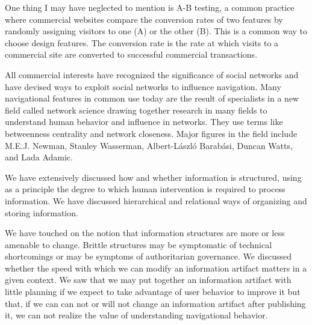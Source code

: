 One thing I may have neglected to mention is A-B testing, a common
practice where commercial websites compare the conversion rates of two
features by randomly assigning visitors to one (A) or the other (B).
This is a common way to choose design features. The conversion rate is
the rate at which visits to a commercial site are converted to
successful commercial transactions.

\hypertarget{social-network-influence-on-navigation}{%
\label{social-network-influence-on-navigation}}

All commercial interests have recognized the significance of social
networks and have devised ways to exploit social networks to influence
navigation. Many navigational features in common use today are the
result of specialists in a new field called network science drawing
together research in many fields to understand human behavior and
influence in networks. They use terms like betweenness centrality and
network closeness. Major figures in the field include M.E.J. Newman,
Stanley Wasserman, Albert-László Barabási, Duncan Watts, and Lada
Adamic.

\hypertarget{information-structure}{%
\label{information-structure}}

We have extensively discussed how and whether information is structured,
using as a principle the degree to which human intervention is required
to process information. We have discussed hierarchical and relational
ways of organizing and storing information.

\hypertarget{flexibility-of-representation}{%
\label{flexibility-of-representation}}

We have touched on the notion that information structures are more or
less amenable to change. Brittle structures may be symptomatic of
technical shortcomings or may be symptoms of authoritarian governance.
We discussed whether the speed with which we can modify an information
artifact matters in a given context. We saw that we may put together an
information artifact with little planning if we expect to take advantage
of user behavior to improve it but that, if we can can not or will not
change an information artifact after publishing it, we can not realize
the value of understanding navigational behavior.

\hypertarget{information-design-patterns}{%
\label{information-design-patterns}}

